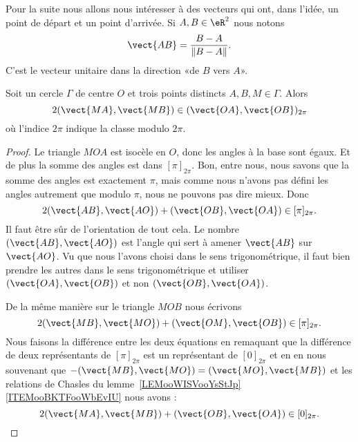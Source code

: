 Pour la suite nous allons nous intéresser à des vecteurs qui ont, dans l'idée, un point de départ et un point d'arrivée. Si \( A,B\in \eR^2\) nous notons
\begin{equation}
    \vect{ AB }=\frac{ B-A }{ \| B-A \| }.
\end{equation}
C'est le vecteur unitaire dans la direction «de \( B\) vers $A$».

\begin{theorem}       \label{THOooQDNKooTlVmmj}
    Soit un cercle \( \Gamma\) de centre \( O\) et trois points distincts \( A,B,M\in \Gamma\). Alors
    \begin{equation}
        2(\vect{ MA },\vect{ MB })\in (\vect{ OA },\vect{ OB })_{2\pi}
    \end{equation}
    où l'indice \( 2\pi\) indique la classe modulo \( 2\pi\).
\end{theorem}

\begin{proof}
    Le triangle \( MOA\) est isocèle en \( O\), donc les angles à la base sont égaux. Et de plus la somme des angles est dans \( [\pi]_{2\pi}\). Bon, entre nous, nous savons que la somme des angles est exactement \( \pi\), mais comme nous n'avons pas défini les angles autrement que modulo \( \pi\), nous ne pouvons pas dire mieux. Donc
    \begin{equation}
        2(\vect{ AB },\vect{ AO })+(\vect{ OB },\vect{ OA })\in [\pi]_{2\pi}.
    \end{equation}
    Il faut être sûr de l'orientation de tout cela. Le nombre \( (\vect{ AB },\vect{ AO })\) est l'angle qui sert à amener \( \vect{ AB }\) sur \( \vect{ AO }\). Vu que nous l'avons choisi dans le sens trigonométrique, il faut bien prendre les autres dans le sens trigonométrique et utiliser \( (\vect{ OA }, \vect{ OB })\) et non \( (\vect{ OB },\vect{ OA })\).

\begin{center}
   
\end{center}

De la même manière sur le triangle \( MOB\) nous écrivons
\begin{equation}
    2(\vect{ MB },\vect{ MO })+(\vect{ OM },\vect{ OB })\in[\pi]_{2\pi}.
\end{equation}
Nous faisons la différence entre les deux équations en remaquant que la différence de deux représentants de \( [\pi]_{2\pi}\) est un représentant de \( [0]_{2\pi}\) et en en nous souvenant que \( -(\vect{ MB },\vect{ MO })=(\vect{ MO },\vect{ MB })\) et les relations de Chasles du lemme~\ref{LEMooWISVooYsStJp}\ref{ITEMooBKTFooWbEvIU} nous avons :
\begin{equation}
    2(\vect{ MA },\vect{ MB })+(\vect{ OB },\vect{ OA })\in[0]_{2\pi}.
\end{equation}
\end{proof}


